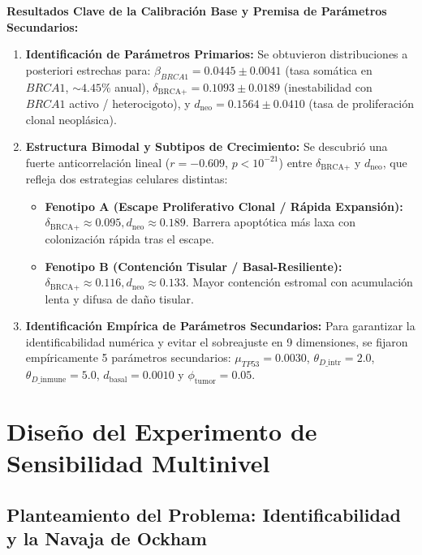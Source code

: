 \documentclass[10pt,a4paper]{article}
\begin{document}
\vspace{0.5em}
\noindent\textbf{Resultados Clave de la Calibración Base y Premisa de Parámetros Secundarios:}
\begin{enumerate}
    \item \textbf{Identificación de Parámetros Primarios:} Se obtuvieron distribuciones a posteriori estrechas para: $\beta_{BRCA1} = 0.0445 \pm 0.0041$ (tasa somática en $BRCA1$, $\sim 4.45\%$ anual), $\delta_{\text{BRCA+}} = 0.1093 \pm 0.0189$ (inestabilidad con $BRCA1$ activo / heterocigoto), y $d_{\text{neo}} = 0.1564 \pm 0.0410$ (tasa de proliferación clonal neoplásica).
    \item \textbf{Estructura Bimodal y Subtipos de Crecimiento:} Se descubrió una fuerte anticorrelación lineal ($r = -0.609$, $p < 10^{-21}$) entre $\delta_{\text{BRCA+}}$ y $d_{\text{neo}}$, que refleja dos estrategias celulares distintas:
    \begin{itemize}
        \item \textbf{Fenotipo A (Escape Proliferativo Clonal / Rápida Expansión):} $\delta_{\text{BRCA+}} \approx 0.095, d_{\text{neo}} \approx 0.189$. Barrera apoptótica más laxa con colonización rápida tras el escape.
        \item \textbf{Fenotipo B (Contención Tisular / Basal-Resiliente):} $\delta_{\text{BRCA+}} \approx 0.116, d_{\text{neo}} \approx 0.133$. Mayor contención estromal con acumulación lenta y difusa de daño tisular.
    \end{itemize}
    \item \textbf{Identificación Empírica de Parámetros Secundarios:} Para garantizar la identificabilidad numérica y evitar el sobreajuste en 9 dimensiones, se fijaron empíricamente 5 parámetros secundarios: $\mu_{TP53} = 0.0030$, $\theta_{D\text{\_intr}} = 2.0$, $\theta_{D\text{\_inmune}} = 5.0$, $d_{\text{basal}} = 0.0010$ y $\phi_{\text{tumor}} = 0.05$.
\end{enumerate}

\section{Diseño del Experimento de Sensibilidad Multinivel}

\subsection{Planteamiento del Problema: Identificabilidad y la Navaja de Ockham}
\end{document}
